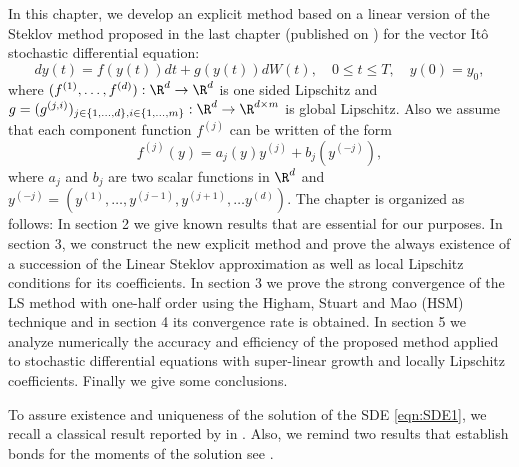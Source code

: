 In this chapter, we develop an explicit method based on a linear version  of the Steklov method proposed 
in the last chapter (published on \cite{Diaz-Infante2015})  for the  vector It\^o stochastic differential equation:
\begin{equation}\label{eqn:SDE1}
dy(t)
=f(y(t))dt + g(y(t))dW(t), \quad 0\leq t\leq T,
\quad y(0)=y_0,
\end{equation}
where $(f^{(1)},\dots, f^{(d)}):\R^d \to \R^d$ is one sided Lipschitz and 
$g = (g^{(j,i)})_{j\in \{1,\dots,d\}, i\in\{1,\dots, m\}}:\R^d \to \R^{d\times m}$ is global Lipschitz. 
Also we assume 
that  each component function $f^{(j)}$  can be written of the form
\begin{equation}\label{eqn:AlternativeConstruction}
f^{(j)}(y) = a_j(y) y^{(j)} + b_j (y^{(-j)}), 
\end{equation}
where $a_j$ and	$b_{j}$ are two scalar 	functions in  $\R^d$ 
and $y^{(-j)} = \left( y^{(1)},\dots,y^{(j-1)},y^{(j+1)},\dots y^{(d)}\right)$. 
The chapter is organized as follows: In section 2 we give known results that are essential
for our purposes. In section 3, we construct the new explicit method and prove  
the always existence of a succession of the Linear Steklov  approximation as well as 
local Lipschitz conditions for its coefficients.  
In section 3 we prove the strong convergence of the LS method 
with one-half order using the Higham, Stuart and 
Mao (HSM) technique and in section 4 its  convergence rate is obtained. 
In section 5 we analyze numerically  the accuracy and efficiency of the proposed method 
applied to stochastic  differential equations with super-linear growth and locally Lipschitz coefficients. 
Finally we give some conclusions.









To assure existence and uniqueness of the solution of the SDE \eqref{eqn:SDE1}, we recall a 
classical result reported by \citeauthor*{Mao2013} in \cite{Mao2013}.  Also, we remind two results that establish bonds
for the moments of the solution see \cite{Higham2002b,Mao2007}.

